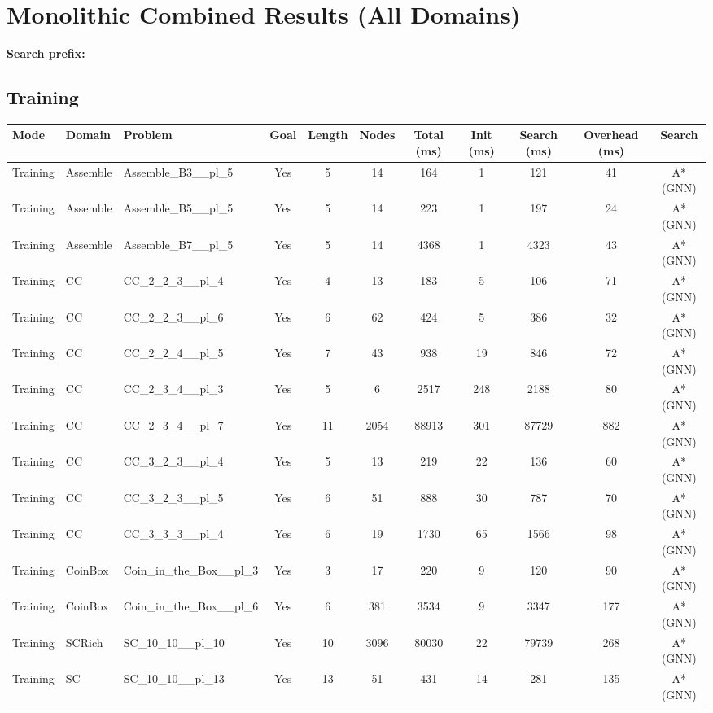 \documentclass{article}
\begin{document}
\section*{Monolithic Combined Results (All Domains)}
\textbf{Search prefix:} 
\\[0.5cm]
\subsection*{Training}
\begin{tabular}{lllcccccccc}
\toprule
Mode & Domain & Problem & Goal & Length & Nodes & Total (ms) & Init (ms) & Search (ms) & Overhead (ms) & Search \\
\midrule
Training & Assemble & Assemble\_B3\_\_pl\_5 & Yes & 5 & 14 & 164 & 1 & 121 & 41 & A*(GNN) \\
Training & Assemble & Assemble\_B5\_\_pl\_5 & Yes & 5 & 14 & 223 & 1 & 197 & 24 & A*(GNN) \\
Training & Assemble & Assemble\_B7\_\_pl\_5 & Yes & 5 & 14 & 4368 & 1 & 4323 & 43 & A*(GNN) \\
Training & CC & CC\_2\_2\_3\_\_pl\_4 & Yes & 4 & 13 & 183 & 5 & 106 & 71 & A*(GNN) \\
Training & CC & CC\_2\_2\_3\_\_pl\_6 & Yes & 6 & 62 & 424 & 5 & 386 & 32 & A*(GNN) \\
Training & CC & CC\_2\_2\_4\_\_pl\_5 & Yes & 7 & 43 & 938 & 19 & 846 & 72 & A*(GNN) \\
Training & CC & CC\_2\_3\_4\_\_pl\_3 & Yes & 5 & 6 & 2517 & 248 & 2188 & 80 & A*(GNN) \\
Training & CC & CC\_2\_3\_4\_\_pl\_7 & Yes & 11 & 2054 & 88913 & 301 & 87729 & 882 & A*(GNN) \\
Training & CC & CC\_3\_2\_3\_\_pl\_4 & Yes & 5 & 13 & 219 & 22 & 136 & 60 & A*(GNN) \\
Training & CC & CC\_3\_2\_3\_\_pl\_5 & Yes & 6 & 51 & 888 & 30 & 787 & 70 & A*(GNN) \\
Training & CC & CC\_3\_3\_3\_\_pl\_4 & Yes & 6 & 19 & 1730 & 65 & 1566 & 98 & A*(GNN) \\
Training & CoinBox & Coin\_in\_the\_Box\_\_pl\_3 & Yes & 3 & 17 & 220 & 9 & 120 & 90 & A*(GNN) \\
Training & CoinBox & Coin\_in\_the\_Box\_\_pl\_6 & Yes & 6 & 381 & 3534 & 9 & 3347 & 177 & A*(GNN) \\
Training & SCRich & SC\_10\_10\_\_pl\_10 & Yes & 10 & 3096 & 80030 & 22 & 79739 & 268 & A*(GNN) \\
Training & SC & SC\_10\_10\_\_pl\_13 & Yes & 13 & 51 & 431 & 14 & 281 & 135 & A*(GNN) \\

\end{tabular}
\end{document}
